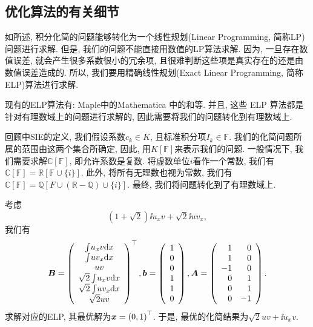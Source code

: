 \subsection{优化算法的有关细节}\label{optMethods-03}

如所述, 积分化简的问题能够转化为一个线性规划(Linear Programming, 简称LP)问题进行求解. 但是, 我们的问题不能直接用数值的LP算法求解. 因为, 一旦存在数值误差, 就会产生很多系数很小的冗余项, 且很难判断这些项是真实存在的还是由数值误差造成的. 所以, 我们要用精确线性规划(Exact Linear Programming, 简称ELP)算法进行求解. 

现有的ELP算法有: Maple中的\D Mathematica 中的\D {}\cite{soplex}和\cite{qsoptex}等. 并且, 这些 ELP 算法都是针对有理数域上的问题进行求解的, 因此需要将我们的问题转化到有理数域上. 

回顾中SIE的定义, 我们假设系数$c_k\in K$, 且标准积分项$I_k\in \mathbb F$. 我们的化简问题所属的范围由这两个集合所确定, 因此, 用$K[\mathbb F]$来表示我们的问题. 一般情况下, 我们需要求解$\mathbb C[\mathbb F]$, 即允许系数是复数. 将虚数单位$i$看作一个常数, 我们有$\mathbb C[\mathbb F]=\mathbb R[\mathbb F \cup \{i\}]$. 此外, 将所有无理数也视为常数, 我们有$\mathbb C[\mathbb F]=\mathbb Q[F\cup (\mathbb R - \mathbb Q) \cup \{i\}]$. 最终, 我们将问题转化到了有理数域上. 

\begin{example}
考虑
\begin{equation}
\left(1+\sqrt{2}\right)\ii{u_x v}+\sqrt{2}\ii{u v_x}, 
\end{equation}
我们有 
\begin{equation}
\bm{B}=\left(
\begin{array}{c}
\int\!{u_x v\mathrm{d}x}  \\
\int\!{u v_x\mathrm{d}x}  \\
u v         \\
\sqrt{2}\int\!{u_x v\mathrm{d}x}  \\
\sqrt{2}\int\!{u v_x\mathrm{d}x}  \\
\sqrt{2}u v         \\
\end{array}
\right)^\top,
\bm{b}=\left(
\begin{array}{c}
1   \\
0   \\
0   \\
1   \\
1   \\
0   \\
\end{array}
\right),
\bm{A}=\left(
\begin{array}{rr}
1   & 0\\
1   & 0\\
-1  & 0\\
0   & 1\\
0   & 1\\
0   & -1\\
\end{array}
\right).
\end{equation}
求解对应的ELP, 其最优解为$\bm{x}=\left(0,1\right)^\top$. 于是, 最优的化简结果为$\sqrt{2}uv+\ii{u_x v}$. 
\end{example}

